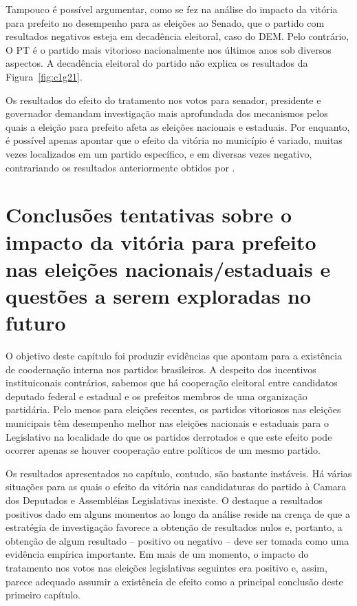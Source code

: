 Tampouco é possível argumentar, como se fez na análise do impacto da vitória para prefeito no desempenho para as eleições ao Senado, que o partido com resultados negativos esteja em decadência eleitoral, caso do DEM. Pelo contrário, O PT é o partido mais vitorioso nacionalmente nos últimos anos sob diversos aspectos. A decadência eleitoral do partido não explica os resultados da Figura~\ref{fig:c1g21}.

Os resultados do efeito do tratamento nos votos para senador, presidente e governador demandam investigação mais aprofundada dos mecanismos pelos quais a eleição para prefeito afeta as eleições nacionais e estaduais. Por enquanto, é possível apenas apontar que o efeito da vitória no município é variado, muitas vezes localizados em um partido específico, e em diversas vezes negativo, contrariando os resultados anteriormente obtidos por \citeauthor{Ames1994}.

\section{Conclusões tentativas sobre o impacto da vitória para prefeito nas eleições nacionais/estaduais e questões a serem exploradas no futuro}

O objetivo deste capítulo foi produzir evidências que apontam para a existência de coodernação interna nos partidos brasileiros. A despeito dos incentivos instituiconais contrários, sabemos que há cooperação eleitoral entre candidatos deputado federal e estadual e os prefeitos membros de uma organização partidária. Pelo menos para eleições recentes, os partidos vitoriosos nas eleições municipais têm desempenho melhor nas eleições nacionais e estaduais para o Legislativo na localidade do que os partidos derrotados e que este efeito pode ocorrer apenas se houver cooperação entre políticos de um mesmo partido.

Os resultados apresentados no capítulo, contudo, são bastante instáveis. Há várias situações para as quais o efeito da vitória nas candidaturas do partido à Camara dos Deputados e Assembléias Legislativas inexiste. O destaque a resultados positivos dado em alguns momentos ao longo da análise reside na crença de que a estratégia de investigação favorece a obtenção de resultados nulos e, portanto, a obtenção de algum resultado -- positivo ou negativo -- deve ser tomada como uma evidência empírica importante. Em mais de um momento, o impacto do tratamento nos votos nas eleições legislativas seguintes era positivo e, assim, parece adequado assumir a existência de efeito como a principal conclusão deste primeiro capítulo.

